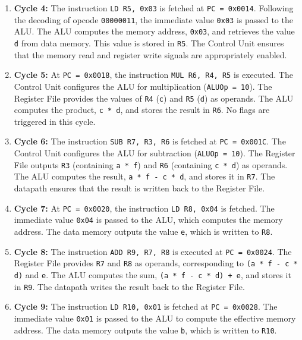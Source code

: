 \documentclass[12pt]{article}
\begin{document}
\begin{enumerate}
    \item \textbf{Cycle 4:} The instruction \texttt{LD R5, 0x03} is fetched at \texttt{PC = 0x0014}. Following the decoding of opcode \texttt{00000011}, the immediate value \texttt{0x03} is passed to the ALU. The ALU computes the memory address, \texttt{0x03}, and retrieves the value \texttt{d} from data memory. This value is stored in \texttt{R5}. The Control Unit ensures that the memory read and register write signals are appropriately enabled.

    \item \textbf{Cycle 5:} At \texttt{PC = 0x0018}, the instruction \texttt{MUL R6, R4, R5} is executed. The Control Unit configures the ALU for multiplication (\texttt{ALUOp = 10}). The Register File provides the values of \texttt{R4} (\texttt{c}) and \texttt{R5} (\texttt{d}) as operands. The ALU computes the product, \texttt{c * d}, and stores the result in \texttt{R6}. No flags are triggered in this cycle.

    \item \textbf{Cycle 6:} The instruction \texttt{SUB R7, R3, R6} is fetched at \texttt{PC = 0x001C}. The Control Unit configures the ALU for subtraction (\texttt{ALUOp = 10}). The Register File outputs \texttt{R3} (containing \texttt{a * f}) and \texttt{R6} (containing \texttt{c * d}) as operands. The ALU computes the result, \texttt{a * f - c * d}, and stores it in \texttt{R7}. The datapath ensures that the result is written back to the Register File.

    \item \textbf{Cycle 7:} At \texttt{PC = 0x0020}, the instruction \texttt{LD R8, 0x04} is fetched. The immediate value \texttt{0x04} is passed to the ALU, which computes the memory address. The data memory outputs the value \texttt{e}, which is written to \texttt{R8}.

    \item \textbf{Cycle 8:} The instruction \texttt{ADD R9, R7, R8} is executed at \texttt{PC = 0x0024}. The Register File provides \texttt{R7} and \texttt{R8} as operands, corresponding to \texttt{(a * f - c * d)} and \texttt{e}. The ALU computes the sum, \texttt{(a * f - c * d) + e}, and stores it in \texttt{R9}. The datapath writes the result back to the Register File.

    \item \textbf{Cycle 9:} The instruction \texttt{LD R10, 0x01} is fetched at \texttt{PC = 0x0028}. The immediate value \texttt{0x01} is passed to the ALU to compute the effective memory address. The data memory outputs the value \texttt{b}, which is written to \texttt{R10}.


\end{enumerate}
\end{document}

